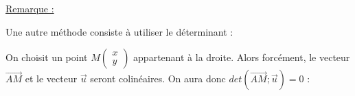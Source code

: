 \documentclass[12pt]{article}
\newcommand*{\Coord}[2]{%
  \ensuremath{
    \begin{pmatrix} 
      #1\\ 
      #2 
    \end{pmatrix}}}
\begin{document}
\vspace{0.5cm}
{\color{black!30}\dotfill}

\vspace{0.5cm}
{\color{black!30}\dotfill}

\vspace{20pt}


\underline{Remarque :}

Une autre méthode consiste à utiliser le déterminant :

\vspace{5pt}
On choisit un point $M\Coord{x}{y}$ appartenant à la droite. Alors forcément, le vecteur 
$\overrightarrow{AM}$ et le vecteur $\overrightarrow{u}$ seront colinéaires. 
On aura donc $det(\overrightarrow{AM};\overrightarrow{u}) = 0$ :

\vspace{0.5cm}
{\color{black!30}\dotfill}

\vspace{0.5cm}
{\color{black!30}\dotfill}

\vspace{0.5cm}
{\color{black!30}\dotfill}

\vspace{0.5cm}
{\color{black!30}\dotfill}

\vspace{20pt}
\end{document}

